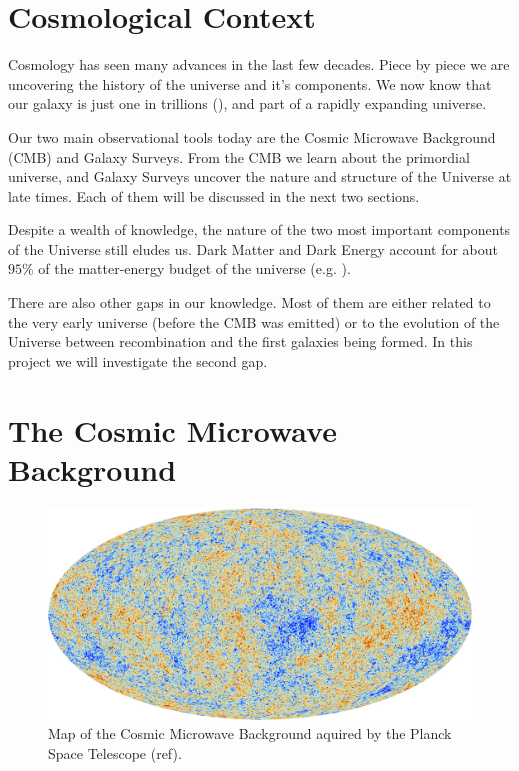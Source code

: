 
\section{Cosmological Context}

Cosmology has seen many advances in the last few decades. Piece by piece we are uncovering the history of the universe and it's components. We now know that our galaxy is just one in trillions (\cite{2016ApJ...830...83C}), and part of a rapidly expanding universe.

Our two main observational tools today are the Cosmic Microwave Background (CMB) and Galaxy Surveys. From the CMB we learn about the primordial universe, and Galaxy Surveys uncover the nature and structure of the Universe at late times. Each of them will be discussed in the next two sections.

Despite a wealth of knowledge, the nature of the two most important components of the Universe still eludes us. Dark Matter and Dark Energy account for about $95\%$ of the matter-energy budget of the universe (e.g. \cite{2016A&A...594A..13P}). 

There are also other gaps in our knowledge. Most of them are either related to the very early universe (before the CMB was emitted) or to the evolution of the Universe between recombination and the first galaxies being formed. In this project we will investigate the second gap.

\section{The Cosmic Microwave Background}



\begin{figure}
    \centering
    \includegraphics[width=0.9\columnwidth]{images/misc/Planck_CMB.jpg}%
    
    \caption{
    Map of the Cosmic Microwave Background aquired by the Planck Space Telescope (ref). 
    }
    
    \label{fig:1}
\end{figure}


